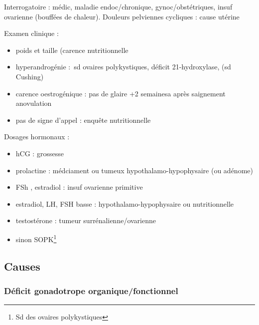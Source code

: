 \documentclass[11pt]{article}
\begin{document}
Interrogatoire : médic, maladie endoc/chronique,
gynoc/obstétriques, insuf ovarienne (bouffées de chaleur). Douleurs pelviennes
cycliques : cause utérine

Examen clinique : 
\begin{itemize}
\item poids et taille (carence nutritionnelle
\item hyperandrogénie : sd ovaires polykystiques, déficit 21-hydroxylase, (sd
Cushing)
\item carence oestrogénique : pas de glaire +2 semainesa après saignement \thus
anovulation
\item pas de signe d'appel : enquête nutritionnelle
\end{itemize}

Dosages hormonaux :
\begin{itemize}
\item hCG : grossesse
\item prolactine \inc : médciament ou tumeux hypothalamo-hypophysaire (ou adénome)
\item FSh \inc, estradiol \dec : insuf ovarienne primitive
\item estradiol, LH, FSH basse : hypothalamo-hypophysaire ou nutritionnelle
\item testostérone : tumeur surrénalienne/ovarienne
\item sinon SOPK\footnote{Sd des ovaires polykystiques}
\end{itemize}

\subsection{Causes}
\label{sec:org18d0b38}

\subsubsection{Déficit gonadotrope organique/fonctionnel}
\label{sec:org60da415}
\end{document}
